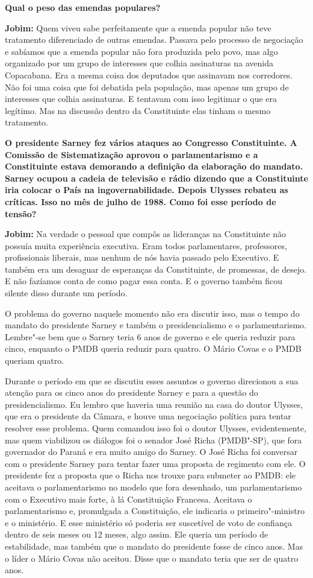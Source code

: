 \textbf{Qual o peso das emendas populares?}

\textbf{Jobim:} Quem viveu sabe perfeitamente que a emenda popular não
teve tratamento diferenciado de outras emendas. Passava pelo processo de
negociação e sabíamos que a emenda popular não fora produzida pelo povo,
mas algo organizado por um grupo de interesses que colhia assinaturas na
avenida Copacabana. Era a mesma coisa dos deputados que assinavam nos
corredores. Não foi uma coisa que foi debatida pela população, mas
apenas um grupo de interesses que colhia assinaturas. E tentavam com
isso legitimar o que era legítimo. Mas na discussão dentro da
Constituinte elas tinham o mesmo tratamento.

\textbf{O presidente Sarney fez vários ataques ao Congresso
Constituinte. A Comissão de Sistematização aprovou o parlamentarismo e a
Constituinte estava demorando a definição da elaboração do mandato.
Sarney ocupou a cadeia de televisão e rádio dizendo que a Constituinte
iria colocar o País na ingovernabilidade. Depois Ulysses rebateu as
críticas. Isso no mês de julho de 1988. Como foi esse período de
tensão?}

\textbf{Jobim:} Na verdade o pessoal que compôs as lideranças na
Constituinte não possuía muita experiência executiva. Eram todos
parlamentares, professores, profissionais liberais, mas nenhum de nós
havia passado pelo Executivo. E também era um desaguar de esperanças da
Constituinte, de promessas, de desejo. E não fazíamos conta de como
pagar essa conta. E o governo também ficou silente disso durante um
período.

O problema do governo naquele momento não era discutir isso, mas o tempo
do mandato do presidente Sarney e também o presidencialismo e o
parlamentarismo. Lembre"-se bem que o Sarney teria 6 anos de governo e
ele queria reduzir para cinco, enquanto o PMDB queria reduzir para
quatro. O Mário Covas e o PMDB queriam quatro.

Durante o período em que se discutiu esses assuntos o governo direcionou
a sua atenção para os cinco anos do presidente Sarney e para a questão
do presidencialismo. Eu lembro que haveria uma reunião na casa do doutor
Ulysses, que era o presidente da Câmara, e houve uma negociação política
para tentar resolver esse problema. Quem comandou isso foi o doutor
Ulysses, evidentemente, mas quem viabilizou os diálogos foi o senador
José Richa (PMDB"-SP), que fora governador do Paraná e era muito amigo do
Sarney. O José Richa foi conversar com o presidente Sarney para tentar
fazer uma proposta de regimento com ele. O presidente fez a proposta que
o Richa nos trouxe para submeter ao PMDB: ele aceitava o parlamentarismo
no modelo que fora desenhado, um parlamentarismo com o Executivo mais
forte, à lá Constituição Francesa. Aceitava o parlamentarismo e,
promulgada a Constituição, ele indicaria o primeiro"-ministro e o
ministério. E esse ministério só poderia ser suscetível de voto de
confiança dentro de seis meses ou 12 meses, algo assim. Ele queria um
período de estabilidade, mas também que o mandato do presidente fosse de
cinco anos. Mas o líder o Mário Covas não aceitou. Disse que o mandato
teria que ser de quatro anos.

